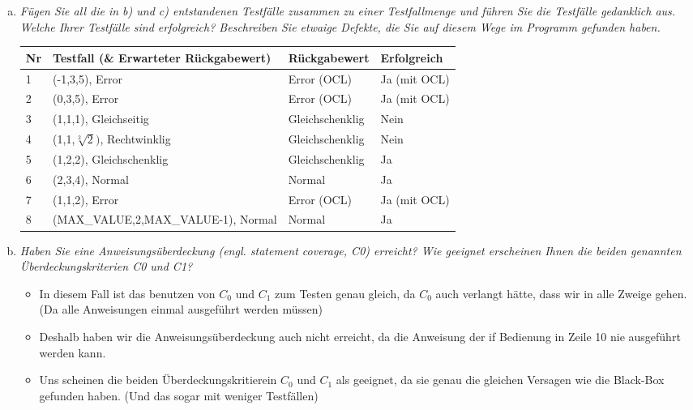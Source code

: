 \begin{enumerate}[(a)]
\item{\itshape Fügen Sie all die in b) und c) entstandenen Testfälle zusammen zu einer Testfallmenge
und führen Sie die Testfälle gedanklich aus. Welche Ihrer Testfälle sind erfolgreich?
Beschreiben Sie etwaige Defekte, die Sie auf diesem Wege im Programm gefunden
haben.}
    \begin{itemize}
         \begin{tabular}{l|l|l|l}
            Nr &  Testfall (\& Erwarteter Rückgabewert) & Rückgabewert & Erfolgreich\\ \hline  
            1 & (-1,3,5), Error & Error (OCL) & Ja (mit OCL)\\ \hline 
            2 & (0,3,5), Error & Error (OCL) & Ja (mit OCL)\\ \hline 
            3 & (1,1,1), Gleichseitig & Gleichschenklig & Nein \\ \hline 
            4 & (1,1,$\sqrt[2]{2})$, Rechtwinklig & Gleichschenklig & Nein \\ \hline 
            5 & (1,2,2), Gleichschenklig & Gleichschenklig & Ja\\ \hline 
            6 & (2,3,4), Normal & Normal & Ja\\ \hline 
            7 & (1,1,2), Error & Error (OCL) & Ja (mit OCL)\\ \hline 
            8 & (MAX\_VALUE,2,MAX\_VALUE-1), Normal & Normal & Ja\\ \hline 
        \end{tabular}
    \end{itemize}

\item{\itshape Haben Sie eine Anweisungsüberdeckung (engl. statement coverage, C0) erreicht? Wie
geeignet erscheinen Ihnen die beiden genannten Überdeckungskriterien C0 und C1?}

    \begin{itemize}
        \item In diesem Fall ist das benutzen von $C_0$ und $C_1$ zum Testen genau gleich, da $C_0$ auch verlangt hätte, dass wir in alle Zweige gehen. (Da alle Anweisungen einmal ausgeführt werden müssen) 
        \item Deshalb haben wir die Anweisungsüberdeckung auch nicht erreicht, da die Anweisung der if Bedienung in Zeile 10 nie ausgeführt werden kann.
        \item Uns scheinen die beiden Überdeckungskritierein $C_0$ und $C_1$ als geeignet, da sie genau die gleichen Versagen wie die Black-Box gefunden haben. (Und das sogar mit weniger Testfällen)
    \end{itemize}


\end{enumerate}
